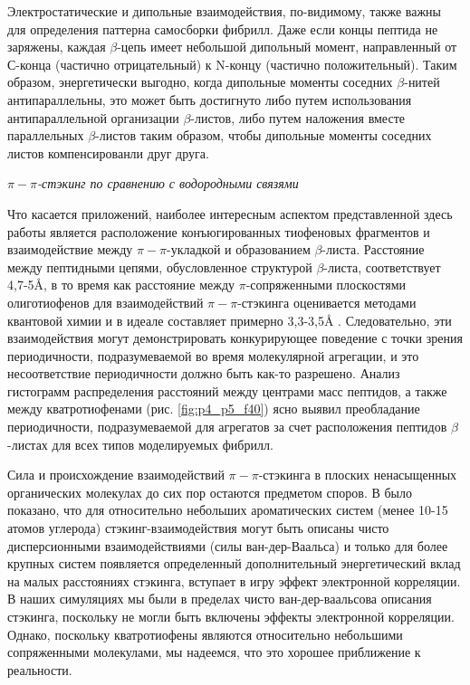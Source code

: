     Электростатические и дипольные взаимодействия, по-видимому, также важны для определения паттерна самосборки фибрилл. Даже если концы пептида не заряжены, каждая $\beta$-цепь имеет небольшой дипольный момент, направленный от С-конца (частично отрицательный) к N-концу (частично положительный). Таким образом, энергетически выгодно, когда дипольные моменты соседних $\beta$-нитей антипараллельны, это может быть достигнуто либо путем использования антипараллельной организации $\beta$-листов, либо путем наложения вместе параллельных $\beta$-листов таким образом, чтобы дипольные моменты соседних листов компенсированли друг друга.
    
    \emph{$\pi - \pi$-стэкинг по сравнению с водородными связями}
    
    Что касается приложений, наиболее интересным аспектом представленной здесь работы является расположение конъюгированных тиофеновых фрагментов и взаимодействие между $\pi - \pi$-укладкой и образованием $\beta$-листа. Расстояние между пептидными цепями, обусловленное структурой $\beta$-листа, соответствует 4,7-5\AA, в то время как расстояние между $\pi$-сопряженными плоскостями олиготиофенов для взаимодействий $\pi - \pi$-стэкинга оценивается методами квантовой химии и в идеале составляет примерно 3,3-3,5\AA{} \cite{rodriguez-ropero_ab_2008,tsuzuki_model_2002}. Следовательно, эти взаимодействия могут демонстрировать конкурирующее поведение с точки зрения периодичности, подразумеваемой во время молекулярной агрегации, и это несоответствие периодичности должно быть как-то разрешено. Анализ гистограмм распределения расстояний между центрами масс пептидов, а также между кватротиофенами (рис. \ref{fig:p4_p5_f40}) ясно выявил преобладание периодичности, подразумеваемой для агрегатов за счет расположения пептидов $\beta$-листах для всех типов моделируемых фибрилл.
    
    Сила и происхождение взаимодействий $\pi - \pi$-стэкинга в плоских ненасыщенных органических молекулах до сих пор остаются предметом споров. В  \cite{grimme_special_2008} было показано, что для относительно небольших ароматических систем (менее 10-15 атомов углерода) стэкинг-взаимодействия могут быть описаны чисто дисперсионными взаимодействиями (силы ван-дер-Ваальса) и только для более крупных систем появляется определенный дополнительный энергетический вклад на малых расстояниях стэкинга, вступает в игру эффект электронной корреляции. В наших симуляциях мы были в пределах чисто ван-дер-ваальсова описания стэкинга, поскольку не могли быть включены эффекты электронной корреляции. Однако, поскольку кватротиофены являются относительно небольшими сопряженными молекулами, мы надеемся, что это хорошее приближение к реальности.
    

